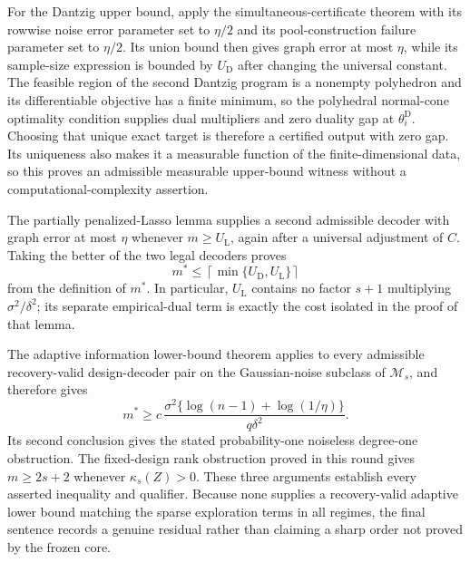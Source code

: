 For the Dantzig upper bound, apply the simultaneous-certificate theorem with its rowwise noise error parameter set to \(\eta/2\) and its pool-construction failure parameter set to \(\eta/2\).  Its union bound then gives graph error at most \(\eta\), while its sample-size expression is bounded by \(U_{\mathrm D}\) after changing the universal constant.  The feasible region of the second Dantzig program is a nonempty polyhedron and its differentiable objective has a finite minimum, so the polyhedral normal-cone optimality condition supplies dual multipliers and zero duality gap at \(\theta_i^{\mathrm D}\).  Choosing that unique exact target is therefore a certified output with zero gap.  Its uniqueness also makes it a measurable function of the finite-dimensional data, so this proves an admissible measurable upper-bound witness without a computational-complexity assertion.

The partially penalized-Lasso lemma supplies a second admissible decoder with graph error at most \(\eta\) whenever \(m\ge U_{\mathrm L}\), again after a universal adjustment of \(C\).  Taking the better of the two legal decoders proves
\[
 m^*\le\left\lceil\min\{U_{\mathrm D},U_{\mathrm L}\}\right\rceil
\]
from the definition of \(m^*\).  In particular, \(U_{\mathrm L}\) contains no factor \(s+1\) multiplying \(\sigma^2/\delta^2\); its separate empirical-dual term is exactly the cost isolated in the proof of that lemma.

The adaptive information lower-bound theorem applies to every admissible recovery-valid design-decoder pair on the Gaussian-noise subclass of \(\mathcal M_s\), and therefore gives
\[
 m^*\ge c\,\frac{\sigma^2\{\log(n-1)+\log(1/\eta)\}}{q\delta^2}.
\]
Its second conclusion gives the stated probability-one noiseless degree-one obstruction.  The fixed-design rank obstruction proved in this round gives \(m\ge2s+2\) whenever \(\kappa_s(Z)>0\).  These three arguments establish every asserted inequality and qualifier.  Because none supplies a recovery-valid adaptive lower bound matching the sparse exploration terms in all regimes, the final sentence records a genuine residual rather than claiming a sharp order not proved by the frozen core.